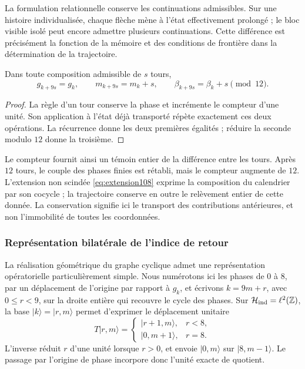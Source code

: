 La formulation relationnelle conserve les continuations admissibles. Sur
une histoire individualisée, chaque flèche mène à l'état effectivement
prolongé ; le bloc visible isolé peut encore admettre plusieurs
continuations. Cette différence est précisément la fonction de la mémoire et
des conditions de frontière dans la détermination de la trajectoire.

\begin{proposition}
\label{mono-ampl:vueltas}
Dans toute composition admissible de \(s\) tours,
\[
 g_{k+9s}=g_k,\qquad m_{k+9s}=m_k+s,\qquad
 \beta_{k+9s}=\beta_k+s\pmod{12}.
\]
\end{proposition}
\begin{proof}
La règle d'un tour conserve la phase et incrémente le compteur d'une
unité. Son application à l'état déjà transporté répète exactement ces
deux opérations. La récurrence donne les deux premières égalités ; réduire la
seconde modulo \(12\) donne la troisième.
\end{proof}

Le compteur fournit ainsi un témoin entier de la différence entre les
tours. Après \(12\) tours, le couple des phases finies est rétabli, mais
le compteur augmente de \(12\). L'extension non scindée
\eqref{eq:extension108} exprime la composition du calendrier par son
cocycle ; la trajectoire conserve en outre le relèvement entier de cette donnée.
La conservation signifie ici le transport des contributions antérieures,
et non l'immobilité de toutes les coordonnées.

\subsubsection{Représentation bilatérale de l'indice de retour}

La réalisation géométrique du graphe cyclique admet une représentation
opératorielle particulièrement simple. Nous numérotons ici les phases de \(0\) à
\(8\), par un déplacement de l'origine par rapport à \(g_k\), et
écrivons \(k=9m+r\), avec \(0\leq r<9\), sur la droite entière
qui recouvre le cycle des phases. Sur
\(\mathcal H_{\rm ind}=\ell^2(\mathbb Z)\), la base
\(|k\rangle=|r,m\rangle\) permet d'exprimer le déplacement unitaire
\[
 T|r,m\rangle=
 \begin{cases}
 |r+1,m\rangle,&r<8,\\
 |0,m+1\rangle,&r=8.
 \end{cases}
\]
L'inverse réduit \(r\) d'une unité lorsque \(r>0\), et envoie
\(|0,m\rangle\) sur \(|8,m-1\rangle\). Le passage par l'origine de phase
incorpore donc l'unité exacte de quotient.

